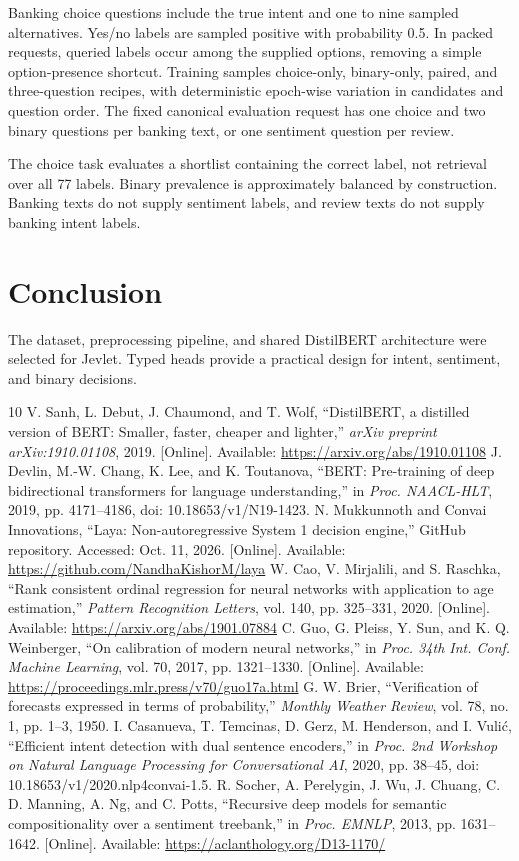 \documentclass[conference]{IEEEtran}
\begin{document}
Banking choice questions include the true intent and one to nine sampled alternatives. Yes/no labels are sampled positive with probability 0.5. In packed requests, queried labels occur among the supplied options, removing a simple option-presence shortcut. Training samples choice-only, binary-only, paired, and three-question recipes, with deterministic epoch-wise variation in candidates and question order. The fixed canonical evaluation request has one choice and two binary questions per banking text, or one sentiment question per review.

The choice task evaluates a shortlist containing the correct label, not retrieval over all 77 labels. Binary prevalence is approximately balanced by construction. Banking texts do not supply sentiment labels, and review texts do not supply banking intent labels.


\section{Conclusion}
The dataset, preprocessing pipeline, and shared DistilBERT architecture were selected for Jevlet. Typed heads provide a practical design for intent, sentiment, and binary decisions.
\begin{thebibliography}{10}
V. Sanh, L. Debut, J. Chaumond, and T. Wolf, ``DistilBERT, a distilled version of BERT: Smaller, faster, cheaper and lighter,'' \emph{arXiv preprint arXiv:1910.01108}, 2019. [Online]. Available: \url{https://arxiv.org/abs/1910.01108}
J. Devlin, M.-W. Chang, K. Lee, and K. Toutanova, ``BERT: Pre-training of deep bidirectional transformers for language understanding,'' in \emph{Proc. NAACL-HLT}, 2019, pp. 4171--4186, doi: 10.18653/v1/N19-1423.
N. Mukkunnoth and Convai Innovations, ``Laya: Non-autoregressive System 1 decision engine,'' GitHub repository. Accessed: Oct. 11, 2026. [Online]. Available: \url{https://github.com/NandhaKishorM/laya}
W. Cao, V. Mirjalili, and S. Raschka, ``Rank consistent ordinal regression for neural networks with application to age estimation,'' \emph{Pattern Recognition Letters}, vol. 140, pp. 325--331, 2020. [Online]. Available: \url{https://arxiv.org/abs/1901.07884}
C. Guo, G. Pleiss, Y. Sun, and K. Q. Weinberger, ``On calibration of modern neural networks,'' in \emph{Proc. 34th Int. Conf. Machine Learning}, vol. 70, 2017, pp. 1321--1330. [Online]. Available: \url{https://proceedings.mlr.press/v70/guo17a.html}
G. W. Brier, ``Verification of forecasts expressed in terms of probability,'' \emph{Monthly Weather Review}, vol. 78, no. 1, pp. 1--3, 1950.
I. Casanueva, T. Temcinas, D. Gerz, M. Henderson, and I. Vuli\'{c}, ``Efficient intent detection with dual sentence encoders,'' in \emph{Proc. 2nd Workshop on Natural Language Processing for Conversational AI}, 2020, pp. 38--45, doi: 10.18653/v1/2020.nlp4convai-1.5.
R. Socher, A. Perelygin, J. Wu, J. Chuang, C. D. Manning, A. Ng, and C. Potts, ``Recursive deep models for semantic compositionality over a sentiment treebank,'' in \emph{Proc. EMNLP}, 2013, pp. 1631--1642. [Online]. Available: \url{https://aclanthology.org/D13-1170/}
\end{thebibliography}
\end{document}
